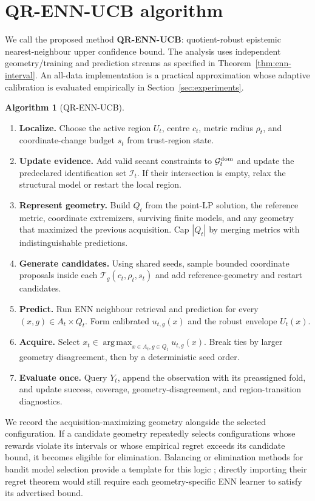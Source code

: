 \documentclass[11pt]{article}
\theoremstyle{definition}
\newtheorem{algorithm}[theorem]{Algorithm}
\theoremstyle{remark}
\newcommand{\Gg}{\mathcal G}
\newcommand{\Ii}{\mathcal I}
\newcommand{\Tt}{\mathcal T}
\newcommand{\1}{\mathbf 1}
\newcommand{\argmax}{\operatorname*{arg\,max}}
\begin{document}
\section{QR-ENN-UCB algorithm}

We call the proposed method \textbf{QR-ENN-UCB}: quotient-robust epistemic nearest-neighbour upper
confidence bound.  The analysis uses independent geometry/training and prediction streams as
specified in Theorem~\ref{thm:enn-interval}.  An all-data implementation is a practical
approximation whose adaptive calibration is evaluated empirically in Section~\ref{sec:experiments}.

\begin{algorithm}[QR-ENN-UCB]
\begin{enumerate}
\item \textbf{Localize.}  Choose the active region $U_t$, centre $c_t$, metric radius $\rho_t$,
and coordinate-change budget $s_t$ from trust-region state.
\item \textbf{Update evidence.}  Add valid secant constraints to $\Gg_t^{\rm dom}$ and update the
predeclared identification set $\Ii_t$.  If their intersection is empty, relax the structural model
or restart the local region.
\item \textbf{Represent geometry.}  Build $Q_t$ from the point-LP solution, the reference metric,
coordinate extremizers, surviving finite models, and any geometry that maximized the previous
acquisition.  Cap $|Q_t|$ by merging metrics with indistinguishable predictions.
\item \textbf{Generate candidates.}  Using shared seeds, sample bounded coordinate proposals inside
each $\Tt_g(c_t,\rho_t,s_t)$ and add reference-geometry and restart candidates.
\item \textbf{Predict.}  Run ENN neighbour retrieval and prediction for every $(x,g)\in A_t\times
Q_t$.  Form calibrated $u_{t,g}(x)$ and the robust envelope $U_t(x)$.
\item \textbf{Acquire.}  Select $x_t\in\argmax_{x\in A_t,g\in Q_t}u_{t,g}(x)$.  Break ties by
larger geometry disagreement, then by a deterministic seed order.
\item \textbf{Evaluate once.}  Query $Y_t$, append the observation with its preassigned fold, and
update success, coverage, geometry-disagreement, and region-transition diagnostics.
\end{enumerate}
\end{algorithm}

We record the acquisition-maximizing geometry alongside the selected configuration.  If a candidate
geometry repeatedly selects configurations whose rewards violate its intervals or whose empirical regret
exceeds its candidate bound, it becomes eligible for elimination.  Balancing or elimination methods
for bandit model selection provide a template for this logic \cite{DynamicBalancing}; directly
importing their regret theorem would still require each geometry-specific ENN learner to satisfy its
advertised bound.
\end{document}
